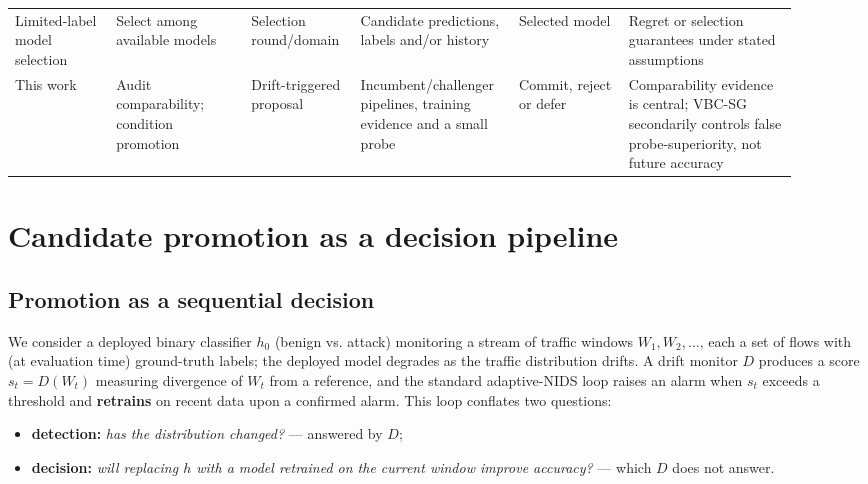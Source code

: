 \documentclass[journal]{IEEEtran}
\begin{document}
\begin{table}[t]
\begin{tabular}{p{0.12\linewidth} p{0.16\linewidth} p{0.12\linewidth} p{0.18\linewidth} p{0.13\linewidth} p{0.20\linewidth}}
Limited-label model selection \cite{karimi2021online,han2024model,okanovic2025models} & Select among available models & Selection round/domain & Candidate predictions, labels and/or history & Selected model & Regret or selection guarantees under stated assumptions \\
This work & Audit comparability; condition promotion & Drift-triggered proposal & Incumbent/challenger pipelines, training evidence and a small probe & Commit, reject or defer & Comparability evidence is central; VBC-SG secondarily controls false probe-superiority, not future accuracy \\
\bottomrule
\end{tabular}
\end{table}


\section{Candidate promotion as a decision pipeline}


\subsection{Promotion as a sequential decision}


We consider a deployed binary classifier $h_0$ (benign vs. attack) monitoring a stream of traffic windows $W_1, W_2, \dots$, each a set of flows with (at evaluation time) ground-truth labels; the deployed model degrades as the traffic distribution drifts. A drift monitor $D$ produces a score $s_t = D(W_t)$ measuring divergence of $W_t$ from a reference, and the standard adaptive-NIDS loop raises an alarm when $s_t$ exceeds a threshold and \textbf{retrains} on recent data upon a confirmed alarm. This loop conflates two questions:

\begin{itemize}
  \item \textbf{detection:} \emph{has the distribution changed?} --- answered by $D$;
  \item \textbf{decision:} \emph{will replacing $h$ with a model retrained on the current window improve accuracy?} --- which $D$ does not answer.
\end{itemize}
\end{document}
